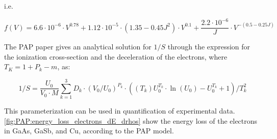
i.e.

\begin{equation}
    \label{eq:theory:quantitative:pap:calculation_of_F:dE_d_rho_s:one_over_f_2}
    f(V) = 6.6 \cdot 10^{-6}\cdot V^{0.78} + 1.12\cdot 10^{-5}\cdot (1.35 - 0.45 J^2) \cdot V^{0.1} + \frac{2.2 \cdot 10^{-6}}{J} \cdot V^{-(0.5-0.25J)}
\end{equation}




The PAP paper gives an analytical solution for $1/S$ through the expression for the ionization cross-section and the deceleration of the electrons, where $ T_K = 1 + P_k - m$, as:

\begin{equation}
    \label{eq:theory:quantitative:pap:calculation_of_F:dE_d_rho_s:analytical}
    1/S = \frac{U_0}{V_0 \cdot M} \sum \limits_{k=1}^{3} D_k \cdot (V_0/U_0)^{P_k} \cdot ((T_k)U_0^{T_k} \cdot \ln(U_0)-U_0^{T_k}+1)/T_k^2
\end{equation}




This parameterization can be used in quantification of experimental data.
\cref{fig:PAP:energy_loss_electrons_dE_drhos} show the energy loss of the electrons in GaAs, GaSb, and Cu, according to the PAP model.


